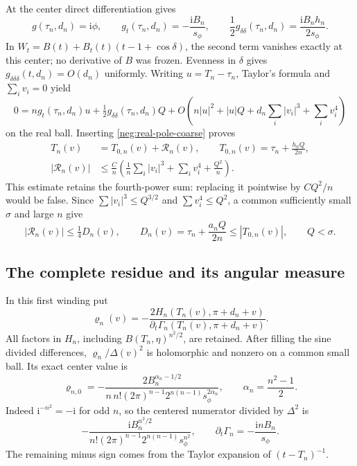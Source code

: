 \documentclass[11pt]{article}
\numberwithin{equation}{section}
\theoremstyle{definition}
\newcommand{\ii}{\mathrm i}
\begin{document}
At the center direct differentiation gives
\[
 g(\tau_n,d_n)=\ii\phi,\qquad
 g_t(\tau_n,d_n)=-\frac{\ii B_n}{s_\phi},\qquad
 \frac12g_{\delta\delta}(\tau_n,d_n)
       =\frac{\ii B_nh_n}{2s_\phi}.
\]
In \(W_t=B(t)+B_t(t)(t-1+\cos\delta)\), the second term
vanishes exactly at this center; no derivative of \(B\) was frozen.
Evenness in \(\delta\) gives
\(g_{\delta\delta\delta}(t,d_n)=O(d_n)\) uniformly.  Writing
\(u=T_n-\tau_n\), Taylor's formula and \(\sum_i v_i=0\) yield
\[
 0=ng_t(\tau_n,d_n)u+\tfrac12g_{\delta\delta}(\tau_n,d_n)Q
 +O\!\left(n|u|^2+|u|Q+
              d_n\sum_i|v_i|^3+\sum_i v_i^4\right)
\]
on the real ball.  Inserting \eqref{neg:real-pole-coarse} proves
\begin{equation}
 \begin{split}
 T_n(v)&=T_{0,n}(v)+\mathcal R_n(v),\qquad
 T_{0,n}(v)=\tau_n+\frac{h_nQ}{2n},\\
 |\mathcal R_n(v)|&\le\frac Cn\left(
     \frac1n\sum_i|v_i|^3+\sum_i v_i^4+\frac{Q^2}{n}\right).
 \end{split}
 \label{neg:real-pole-error}
\end{equation}
This estimate retains the fourth-power sum: replacing it pointwise
by \(CQ^2/n\) would be false.  Since \(\sum|v_i|^3\le Q^{3/2}\)
and \(\sum v_i^4\le Q^2\), a common sufficiently small \(\sigma\)
and large \(n\) give
\begin{equation}
 |\mathcal R_n(v)|\le\tfrac14D_n(v),\qquad
 D_n(v)=\tau_n+\frac{a_nQ}{2n}\le|T_{0,n}(v)|,
 \qquad Q<\sigma.
 \label{neg:real-pole-small}
\end{equation}

\subsection{The complete residue and its angular measure}
\label{neg:real-density}

In this first winding put
\[
 \varrho_n(v)=-\frac{2H_n(T_n(v),\pi+d_n+v)}
                       {\partial_t\Gamma_n(T_n(v),\pi+d_n+v)}.
\]
All factors in \(H_n\), including \(B(T_n,\eta)^{n^2/2}\), are
retained.  After filling the sine divided differences,
\(\varrho_n/\Delta(v)^2\) is holomorphic and nonzero on a common
small ball.  Its exact center value is
\begin{equation}
 \varrho_{n,0}=-\frac{2B_n^{\alpha_n-1/2}}
 {n\,n!(2\pi)^{n-1}2^{n(n-1)}s_\phi^{2\alpha_n}},
 \qquad \alpha_n=\frac{n^2-1}{2}.
 \label{neg:center-residue}
\end{equation}
Indeed \(\ii^{-n^2}=-\ii\) for odd \(n\), so the centered
numerator divided by \(\Delta^2\) is
\[
 -\frac{\ii B_n^{n^2/2}}
 {n!(2\pi)^{n-1}2^{n(n-1)}s_\phi^{n^2}},
 \qquad \partial_t\Gamma_n=-\frac{\ii nB_n}{s_\phi}.
\]
The remaining
minus sign comes from the Taylor expansion of \((t-T_n)^{-1}\).
\end{document}
